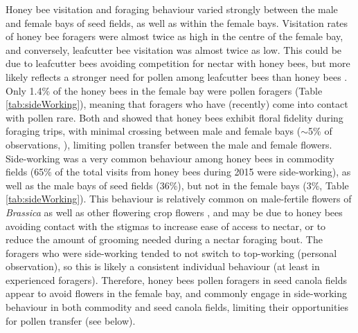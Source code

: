 \documentclass[12pt]{article} %
\begin{document}
Honey bee visitation and foraging behaviour varied strongly between the male and female bays of seed fields, as well as within the female bays.
Visitation rates of honey bee foragers were almost twice as high in the centre of the female bay, and conversely, leafcutter bee visitation was almost twice as low.
This could be due to leafcutter bees avoiding competition for nectar with honey bees, but more likely reflects a stronger need for pollen among leafcutter bees than honey bees \citep{cane2011}.
Only 1.4\% of the honey bees in the female bay were pollen foragers (Table \ref{tab:sideWorking}), meaning that foragers who have (recently) come into contact with pollen rare.
Both \citet{waytesMsc} and \citet{gaffney2019} showed that honey bees exhibit floral fidelity during foraging trips, with minimal crossing between male and female bays ($\sim$5\% of observations, \citealp{waytesMsc}), limiting pollen transfer between the male and female flowers.
Side-working was a very common behaviour among honey bees in commodity fields (65\% of the total visits from honey bees during 2015 were side-working), as well as the male bays of seed fields (36\%), but not in the female bays (3\%, Table \ref{tab:sideWorking}).
This behaviour is relatively common on male-fertile flowers of \textit{Brassica} \citep{free1973,free1983,delbrassine1988,mohr1988} as well as other flowering crop flowers \citep{thomson2001}, and may be due to honey bees avoiding contact with the stigmas to increase ease of access to nectar, or to reduce the amount of grooming needed during a nectar foraging bout.
The foragers who were side-working tended to not switch to top-working (personal observation), so this is likely a consistent individual behaviour (at least in experienced foragers).
Therefore, honey bees pollen foragers in seed canola fields appear to avoid flowers in the female bay, and commonly engage in side-working behaviour in both commodity and seed canola fields, limiting their opportunities for pollen transfer (see below).
\end{document}
